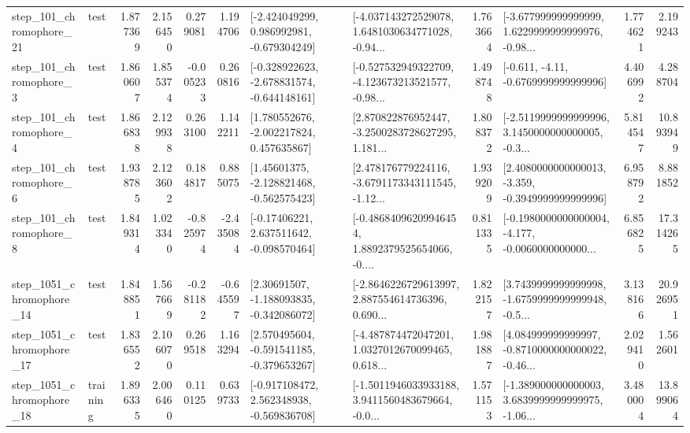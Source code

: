 \begin{tabular}{llrrrrllrlrr}
  step\_101\_chromophore\_21 &      test &      1.877369 &    2.156450 &      0.279081 &  1.194706 &   [-2.424049299, 0.986992981, -0.679304249] &  [-4.037143272529078, 1.6481030634771028, -0.94... &       1.763664 &  [-3.677999999999999, 1.6229999999999976, -0.98... &            1.774621 &          2.199243 \\
   step\_101\_chromophore\_3 &      test &      1.860607 &    1.855374 &     -0.005233 &  0.260816 &  [-0.328922623, -2.678831574, -0.644148161] &  [-0.527532949322709, -4.123673213521577, -0.98... &       1.498748 &               [-0.611, -4.11, -0.6769999999999996] &            4.406992 &          4.288704 \\
   step\_101\_chromophore\_4 &      test &      1.866838 &    2.129938 &      0.263100 &  1.142211 &    [1.780552676, -2.002217824, 0.457635867] &  [2.870822876952447, -3.2500283728627295, 1.181... &       1.808372 &  [-2.5119999999999996, 3.1450000000000005, -0.3... &            5.814547 &         10.893949 \\
   step\_101\_chromophore\_6 &      test &      1.938785 &    2.123602 &      0.184817 &  0.885075 &    [1.45601375, -2.128821468, -0.562575423] &  [2.478176779224116, -3.6791173343111545, -1.12... &       1.939209 &  [2.4080000000000013, -3.359, -0.3949999999999996] &            6.958792 &          8.881852 \\
   step\_101\_chromophore\_8 &      test &      1.849314 &    1.023340 &     -0.825974 & -2.435084 &    [-0.17406221, 2.637511642, -0.098570464] &  [-0.48684096209946454, 1.8892379525654066, -0.... &       0.811335 &  [-0.1980000000000004, -4.177, -0.0060000000000... &            6.856825 &         17.314265 \\
 step\_1051\_chromophore\_14 &      test &      1.848851 &    1.567669 &     -0.281182 & -0.645597 &    [2.30691507, -1.188093835, -0.342086072] &  [-2.8646226729613997, 2.887554614736396, 0.690... &       1.822157 &  [3.7439999999999998, -1.6759999999999948, -0.5... &            3.138166 &         20.926951 \\
 step\_1051\_chromophore\_17 &      test &      1.836552 &    2.106070 &      0.269518 &  1.163294 &   [2.570495604, -0.591541185, -0.379653267] &  [-4.487874472047201, 1.0327012670099465, 0.618... &       1.981887 &  [4.084999999999997, -0.8710000000000022, -0.46... &            2.029410 &          1.562601 \\
 step\_1051\_chromophore\_18 &  training &      1.896335 &    2.006460 &      0.110125 &  0.639733 &   [-0.917108472, 2.562348938, -0.569836708] &  [-1.5011946033933188, 3.9411560483679664, -0.0... &       1.571153 &  [-1.389000000000003, 3.6839999999999975, -1.06... &            3.480004 &         13.899064 \\

\end{tabular}
